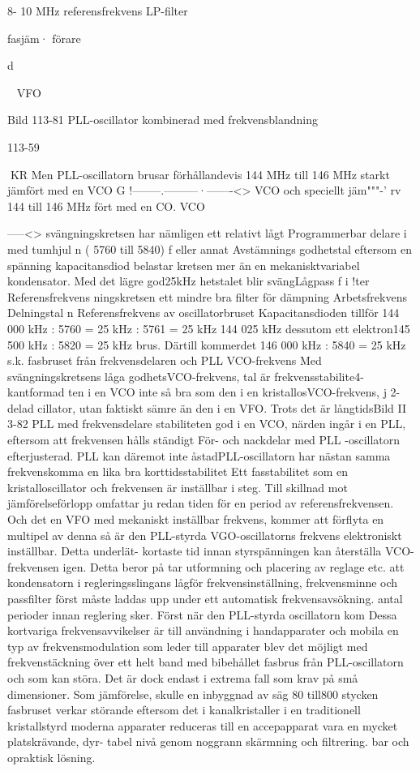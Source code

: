 \documentclass[a4paper,twoside,twocolumn,openright]{book}
\begin{document}
{{{{{{{{8- 10 MHz
referensfrekvens
LP-filter

fasjäm·
förare

d

~
VFO

Bild 113-81 PLL-oscillator kombinerad med frekvensblandning

113-59

KR
Men PLL-oscillatorn
brusar
förhållandevis
144 MHz till 146 MHz
starkt jämfört med en
VCO G !--------.---------·-------<>
VCO och speciellt jäm"""-'
rv 144 till 146 MHz
fört
med en CO. VCO}-----<>
svängningskretsen har
nämligen ett relativt lågt
Programmerbar delare i med tumhjul
n ( 5760 till 5840)
f eller annat
Avstämnings
godhetstal eftersom en
spänning
kapacitansdiod belastar kretsen mer än en
mekanisktvariabel kondensator.
Med det lägre god25kHz
hetstalet blir svängLågpass f i !ter
Referensfrekvens
ningskretsen ett mindre
bra filter för dämpning
Arbetsfrekvens Delningstal n Referensfrekvens
av oscillatorbruset Kapacitansdioden tillför
144 000 kHz
: 5760
= 25 kHz
: 5761
= 25 kHz
144 025 kHz
dessutom ett elektron145 500 kHz
: 5820
= 25 kHz
brus. Därtill kommerdet
146 000 kHz
: 5840
= 25 kHz
s.k. fasbruset från frekvensdelaren och PLL
VCO-frekvens
Med svängningskretsens låga godhetsVCO-frekvens,
tal är frekvensstabilite4-kantformad
ten i en VCO inte så bra
som den i en kristallosVCO-frekvens,
j 2-delad
cillator, utan faktiskt
sämre än den i en VFO.
Trots det är långtidsBild II 3-82 PLL med frekvensdelare
stabiliteten god i en
VCO, närden ingår i en
PLL, eftersom att frekvensen hålls ständigt
För- och nackdelar med PLL -oscillatorn
efterjusterad. PLL kan däremot inte åstadPLL-oscillatorn har nästan samma frekvenskomma en lika bra korttidsstabilitet Ett fasstabilitet som en kristalloscillator och frekvensen är inställbar i steg. Till skillnad mot jämförelseförlopp omfattar ju redan tiden för
en period av referensfrekvensen. Och det
en VFO med mekaniskt inställbar frekvens,
kommer att förflyta en multipel av denna
så är den PLL-styrda VGO-oscillatorns frekvens elektroniskt inställbar. Detta underlät- kortaste tid innan styrspänningen kan återställa VCO-frekvensen igen. Detta beror på
tar utformning och placering av reglage etc.
att kondensatorn i regleringsslingans lågför frekvensinställning, frekvensminne och
passfilter först måste laddas upp under ett
automatisk frekvensavsökning.
antal perioder innan reglering sker.
Först när den PLL-styrda oscillatorn kom
Dessa kortvariga frekvensavvikelser är
till användning i handapparater och mobila
en typ av frekvensmodulation som leder till
apparater blev det möjligt med frekvenstäckning över ett helt band med bibehållet fasbrus från PLL-oscillatorn och som kan
störa. Det är dock endast i extrema fall som
krav på små dimensioner. Som jämförelse,
skulle en inbyggnad av säg 80 till800 stycken fasbruset verkar störande eftersom det i
kanalkristaller i en traditionell kristallstyrd
moderna apparater reduceras till en accepapparat vara en mycket platskrävande, dyr- tabel nivå genom noggrann skärmning och
filtrering.
bar och opraktisk lösning.

}}}}}}}
\end{document}
